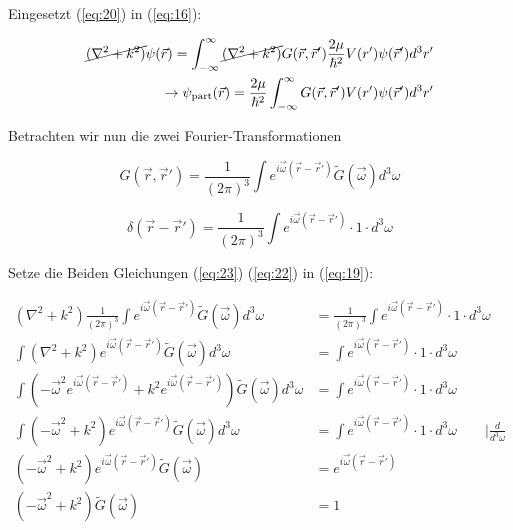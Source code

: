 Eingesetzt (\ref{eq:20})  in (\ref{eq:16}):

\begin{align}
  \label{eq:21}
   \cancel{(\nabla^2 + k^2)}\psi(\vec r) = \int_{-\infty}^\infty \cancel{(\nabla^2 + k^2)} G(\vec r,\vec r')\frac{2\mu}{\hbar^2}V(r')\psi(\vec r') d^3 r' \\
\rightarrow  \psi_{\text{part}}(\vec r) = \frac{2\mu}{\hbar^2} \int_{-\infty}^\infty  G(\vec r,\vec r')V(r')\psi(\vec r') d^3 r' 
\end{align}


Betrachten wir nun die zwei Fourier-Transformationen

\begin{equation}
  \label{eq:22}
  G(\vec r ,\vec r') = \frac{1}{(2\pi)^3}\int e^{i\vec \omega (\vec r -\vec r') }\tilde G (\vec \omega)d^3 \omega
\end{equation}

\begin{equation}
  \label{eq:23}
  \delta(\vec r - \vec r') =  \frac{1}{(2\pi)^3}\int e^{i\vec \omega (\vec r -\vec r') }\cdot 1\cdot d^3 \omega
\end{equation}


Setze die Beiden Gleichungen (\ref{eq:23}) (\ref{eq:22}) in (\ref{eq:19}):

\begin{align}
  \label{eq:24}
   (\nabla^2 + k^2)\frac{1}{(2\pi)^3}\int e^{i\vec \omega (\vec r -\vec r') }\tilde G (\vec \omega)d^3 \omega  &=  \frac{1}{(2\pi)^3}\int e^{i\vec \omega (\vec r -\vec r') }\cdot 1\cdot d^3 \omega \\
\int (\nabla^2 + k^2) e^{i\vec \omega (\vec r -\vec r') }\tilde G (\vec \omega)d^3 \omega  &=  \int e^{i\vec \omega (\vec r -\vec r') }\cdot 1\cdot d^3 \omega \\
\int \left( -\vec \omega^2 e^{i\vec \omega (\vec r -\vec r') }+ k^2 e^{i\vec \omega (\vec r -\vec r') } \right) \tilde G (\vec \omega)d^3 \omega   &=  \int e^{i\vec \omega (\vec r -\vec r') }\cdot 1\cdot d^3 \omega \\
\int \left( -\vec \omega^2 + k^2  \right)e^{i\vec \omega (\vec r -\vec r') } \tilde G (\vec \omega)d^3 \omega   &=  \int e^{i\vec \omega (\vec r -\vec r') }\cdot 1\cdot d^3 \omega \qquad | \frac{d}{d^3\omega} \\
\left( -\vec \omega^2 + k^2  \right)e^{i\vec \omega (\vec r -\vec r') } \tilde G (\vec \omega)   &=  e^{i\vec \omega (\vec r -\vec r') } \\
\left( -\vec \omega^2 + k^2  \right) \tilde G (\vec \omega)   &=  1 
\end{align}


